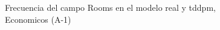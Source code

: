 \begin{figure}[H]
    \centering
    
    \caption{Frecuencia del campo Rooms en el modelo real y tddpm, Economicos (A-1)}
    \label{frecuency-Rooms-tddpm_mlp}
\end{figure}